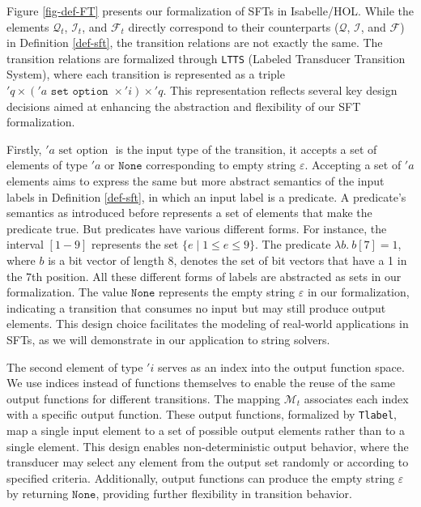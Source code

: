 \documentclass[sigplan,10pt,anonymous,review]{acmart}\settopmatter{printfolios=true,printccs=false,printacmref=false}
\begin{document}
Figure \ref{fig-def-FT} presents our formalization of SFTs in Isabelle/HOL. While the elements $\mathcal{Q}_t$, $\mathcal{I}_t$, and $\mathcal{F}_t$ directly correspond to their counterparts ($\mathcal{Q}$, $\mathcal{I}$, and $\mathcal{F}$) in Definition \ref{def-sft}, the transition relations are not exactly the same.
%
The transition relations are formalized through \texttt{LTTS} (Labeled Transducer Transition System), where each transition is represented as a triple $'q \times ('a \texttt{ set option }\times 'i) \times 'q$. This representation reflects several key design decisions aimed at enhancing the abstraction and flexibility of our SFT formalization.


Firstly, $'a \text{ set option }$ is the input type of the transition, it accepts a set of elements of type $'a$ or $\texttt{None}$ corresponding to empty string $\varepsilon$. 
Accepting a set of $'a$ elements aims to express the same but more abstract semantics of the input labels in Definition \ref{def-sft}, in which an input label is a predicate. A predicate's semantics as introduced before represents a set of elements that make the predicate true. But predicates have various different forms. For instance, the interval $[1-9]$ represents the set $\{e \mid 1 \leq e \leq 9\}$. The predicate $\lambda b.~ b[7] = 1$, where $b$ is a bit vector of length 8, denotes the set of bit vectors that have a 1 in the 7th position. All these different forms of labels are abstracted as sets in our formalization.
%
The value $\texttt{None}$ represents the empty string $\varepsilon$ in our formalization, indicating a transition that consumes no input but may still produce output elements. This design choice facilitates the modeling of real-world applications in SFTs, as we will demonstrate in our application to string solvers.

The second element of type $'i$ serves as an index into the output function space. 
%
We use indices instead of functions themselves to enable the reuse of the same output functions for different transitions.
%
The mapping $\mathcal{M}_t$ associates each index with a specific output function. These output functions, formalized by \texttt{Tlabel}, map a single input element to a set of possible output elements rather than to a single element. This design enables non-deterministic output behavior, where the transducer may select any element from the output set randomly or according to specified criteria. Additionally, output functions can produce the empty string $\varepsilon$ by returning $\texttt{None}$, providing further flexibility in transition behavior.
\end{document}

